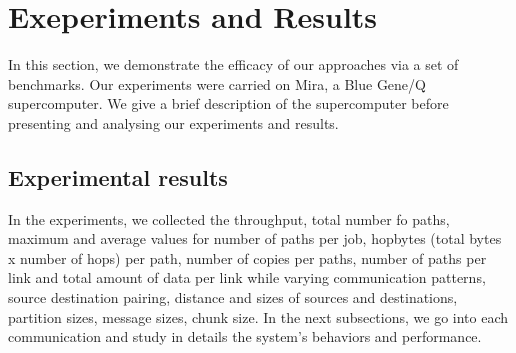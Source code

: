 \section{Exeperiments and Results}
\label{sec:benchmark}

In this section, we demonstrate the efficacy of our approaches via a set of benchmarks. Our experiments were carried on Mira, a Blue Gene/Q supercomputer. We give a brief description of the supercomputer before presenting and analysing our experiments and results.









\subsection{Experimental results}

In the experiments, we collected the throughput, total number fo paths, maximum and average values for number of paths per job, hopbytes (total bytes x number of hops) per path, number of copies per paths, number of paths per link and total amount of data per link while varying communication patterns, source destination pairing, distance and sizes of sources and destinations, partition sizes, message sizes, chunk size.
In the next subsections, we go into each communication and study in details the system's behaviors and performance.




















